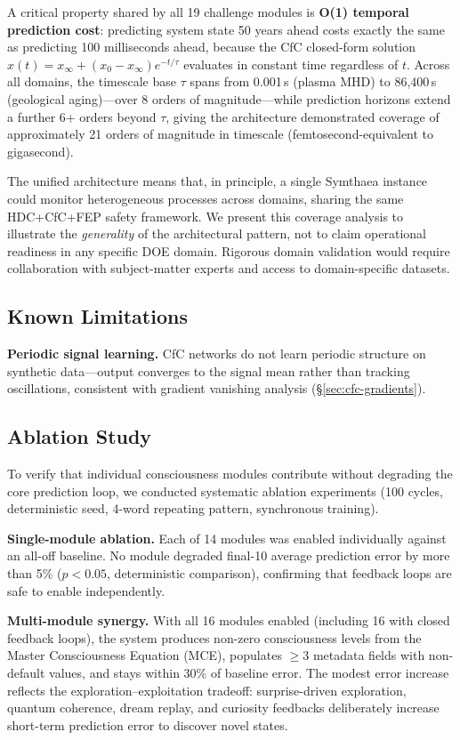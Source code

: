 \documentclass[10pt,letterpaper]{article}
\begin{document}
A critical property shared by all 19 challenge modules is \textbf{O(1) temporal prediction cost}: predicting system state 50 years ahead costs exactly the same as predicting 100 milliseconds ahead, because the CfC closed-form solution $x(t) = x_\infty + (x_0 - x_\infty) e^{-t/\tau}$ evaluates in constant time regardless of $t$. Across all domains, the timescale base $\tau$ spans from 0.001\,s (plasma MHD) to 86,400\,s (geological aging)---over 8 orders of magnitude---while prediction horizons extend a further 6+ orders beyond $\tau$, giving the architecture demonstrated coverage of approximately 21 orders of magnitude in timescale (femtosecond-equivalent to gigasecond).

The unified architecture means that, in principle, a single Symthaea instance could monitor heterogeneous processes across domains, sharing the same HDC+CfC+FEP safety framework. We present this coverage analysis to illustrate the \emph{generality} of the architectural pattern, not to claim operational readiness in any specific DOE domain. Rigorous domain validation would require collaboration with subject-matter experts and access to domain-specific datasets.

\subsection{Known Limitations}

\textbf{Periodic signal learning.} CfC networks do not learn periodic structure on synthetic data---output converges to the signal mean rather than tracking oscillations, consistent with gradient vanishing analysis (\S\ref{sec:cfc-gradients}).

\subsection{Ablation Study}
\label{sec:ablation}

To verify that individual consciousness modules contribute without degrading the core prediction loop, we conducted systematic ablation experiments (100 cycles, deterministic seed, 4-word repeating pattern, synchronous training).

\textbf{Single-module ablation.} Each of 14 modules was enabled individually against an all-off baseline. No module degraded final-10 average prediction error by more than 5\% ($p < 0.05$, deterministic comparison), confirming that feedback loops are safe to enable independently.

\textbf{Multi-module synergy.} With all 16 modules enabled (including 16 with closed feedback loops), the system produces non-zero consciousness levels from the Master Consciousness Equation (MCE), populates $\geq 3$ metadata fields with non-default values, and stays within 30\% of baseline error. The modest error increase reflects the exploration--exploitation tradeoff: surprise-driven exploration, quantum coherence, dream replay, and curiosity feedbacks deliberately increase short-term prediction error to discover novel states.
\end{document}
